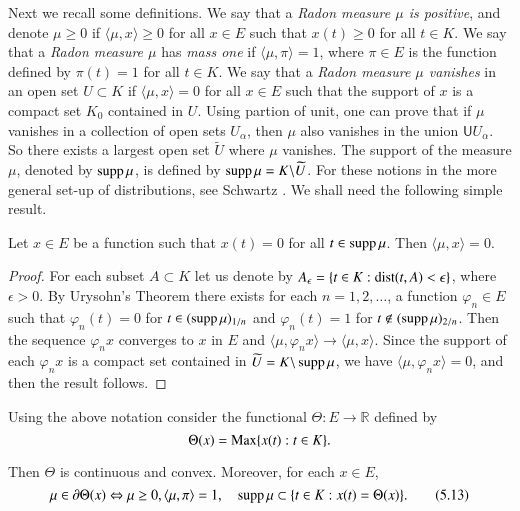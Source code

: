Next we recall some definitions. We say that a {\em Radon measure
  $\mu$ is positive}, and denote $\mu\geq 0$ if $\langle
\mu,x\rangle\geq 0$ for all $x\in E$ such that $x(t)\geq 0$ for all
$t\in K$. We say that a {\em Radon measure $\mu$} has {\em mass one}
if $\langle \mu,\pi\rangle=1$, where $\pi\in E$ is the function
defined by $\pi(t)=1$ for all $t\in K$. We say that a {\em Radon
  measure $\mu$ vanishes} in an open set $U\subset K$ if $\langle \mu,
x\rangle=0$ for all $x\in E$ such that the support of $x$ is a compact
set $K_{0}$ contained in $U$. Using partion of unit, one can prove
that if $\mu$ vanishes in a collection of open sets $U_{\alpha}$, then
$\mu$ also vanishes in the union $\mathsf{U} U_{\alpha}$. So there exists a
largest open set $\widetilde{U}$ where $\mu$ vanishes. The support of
the measure $\mu$, denoted by $\operatorname{supp} \mu$, is defined by $\operatorname{supp}
\mu=K\backslash \widetilde{U}$. For these notions in the more general
set-up of distributions, see Schwartz \cite{key72}. We shall need the
following simple result. 

\begin{lemma}\label{chap5-lem5.5}
Let $x\in E$ be a function such that $x(t)=0$ for all $t\in \operatorname{supp}
\mu$. Then $\langle \mu,x\rangle=0$.
\end{lemma}

\begin{proof}
For each subset $A\subset K$ let us denote by $A_{\epsilon}=\{t\in
K:\operatorname{dist} (t,A)<\epsilon\}$, where $\epsilon>0$. By Urysohn's Theorem
there exists for each $n=1,2,\ldots$, a function $\varphi_{n}\in E$
such that $\varphi_{n}(t)=0$ for $t\in (\operatorname{supp} \mu)_{1/n}$ and
$\varphi_{n}(t)=1$ for $t\not\in (\operatorname{supp} \mu)_{2/n}$. Then the sequence
$\varphi_{n}x$ converges to $x$ in $E$ and $\langle
\mu,\varphi_{n}x\rangle\to \langle \mu, x\rangle$. Since the support
of each $\varphi_{n}x$ is a compact set contained in
$\widetilde{U}=K\backslash \operatorname{supp} \mu$, we have $\langle
\mu,\varphi_{n}x\rangle=0$, and then the result follows. 
\end{proof}

\begin{proposition}\label{chap5-prop5.6}
Using the above notation consider the functional
$\Theta:E\to\mathbb{R}$ defined by
$$
\Theta(x)=\operatorname{Max}\{x(t):t\in K\}.
$$

Then $\Theta$ is continuous and convex. Moreover, for each $x\in E$,
\begin{equation*}
\mu\in \partial \Theta(x)\Leftrightarrow \mu\geq 0,\langle
\mu,\pi\rangle=1,\quad \operatorname{supp}\mu\subset \{t\in
K:x(t)=\Theta(x)\}.\tag{5.13}\label{chap5-eq5.13}
\end{equation*}
\end{proposition}

